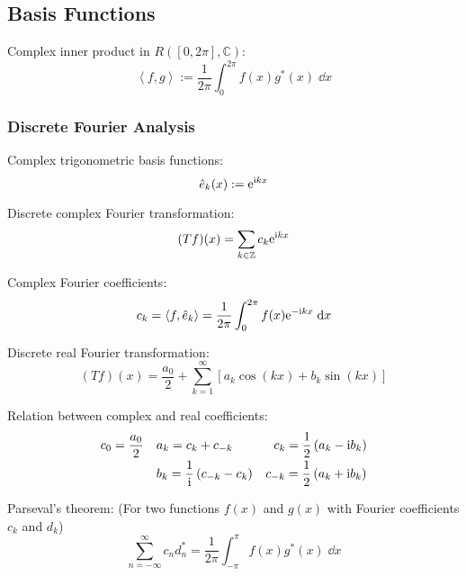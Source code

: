 	\subsection{Basis Functions}
		\noindent
		Complex inner product in $R([0,2\pi],\mathbb{C})$:
		\begin{equation}
			\left<f,g\right>:=\frac{1}{2\pi}\int_0^{2\pi} f(x)g^* (x)\;\dd x
		\end{equation}

		\subsubsection{Discrete Fourier Analysis}
			\noindent
			Complex trigonometric basis functions:
			\begin{equation}
				\hat{e}_k(x):=\mathrm{e}^{\mathrm{i} kx}
			\end{equation}

			\noindent
			Discrete complex Fourier transformation:
			\begin{equation}
				(Tf)(x)=\sum_{k\in\mathbb{Z}}c_k \mathrm{e}^{\mathrm{i} kx}
			\end{equation}

			\noindent
			Complex Fourier coefficients:
			\begin{equation}
				c_k = \left<f,\hat{e}_k\right>=\frac{1}{2\pi}\int_0^{2\pi}f(x)\mathrm{e}^{-\mathrm{i} kx}\;\dd x
			\end{equation}

			\noindent
			Discrete real Fourier transformation:
			\begin{equation}
				(Tf)(x)=\frac{a_0}{2}+\sum_{k=1}^{\infty}\left[a_k \cos(kx) + b_k \sin(kx) \right]
			\end{equation}

			\noindent
			Relation between complex and real coefficients:
			\begin{equation}
				\begin{array}{clc}
					c_0 = \dfrac{a_0}{2} & a_k = c_k+c_{-k} & \phantom{_{-}}c_k = \dfrac{1}{2}\left(a_k-\i b_k\right) \\ [6pt]
					& b_k = \dfrac{1}{\i}\left(c_{-k}-c_{k}\right) & c_{-k} = \dfrac{1}{2}\left(a_k+\i b_k\right) \\
				\end{array}
			\end{equation}

			\noindent
			Parseval's theorem: (For two functions $f(x)$ and $g(x)$ with Fourier coefficients $c_k$ and $d_k$)
			\begin{equation}
				\sum_{n=-\infty}^{\infty} c_n d_n^* = \frac{1}{2\pi}\int_{-\pi}^{\pi} f(x)g^*(x)\;\dd x
			\end{equation}

